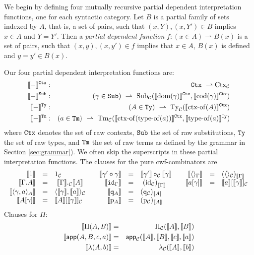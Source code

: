 \documentclass{lmcs}
\newcommand{\intCtxU}[1]{\llbracket #1 \rrbracket^\RawCtx}
\newcommand{\intSubU}[1]{\llbracket #1 \rrbracket^\RawSub}
\newcommand{\intTyU}[1]{\llbracket #1 \rrbracket^\RawTy}
\newcommand{\intTmU}[1]{\llbracket #1 \rrbracket^\RawTm}
\begin{document}
We begin by defining four mutually recursive partial dependent interpretation functions, one for each syntactic category. Let $B$ is a partial family of sets indexed by $A$, that is, a set of pairs, such that $(x,Y), (x,Y') \in B$ implies $x \in A$ and $Y=Y'$. Then a {\em partial dependent function} $f :  (x \in A) \rightharpoonup B(x)$  is a set of pairs, such that $(x,y), (x,y') \in f$ implies that $x \in A$, $B(x)$ is defined and $y = y' \in B(x)$.

Our four partial dependent interpretation functions are:
\begin{eqnarray*}
\intCtxU{-} &:& \RawCtx\ \rightharpoonup \Ctx_\C\\
\intSubU{-}&:& (\gamma \in \RawSub)\ \rightharpoonup \
\Sub_\C(\intCtxU{\domain(\gamma)}, \intCtxU{\codomain(\gamma)})\\
\intTyU{-}&:& (A \in \RawTy)\ \rightharpoonup\ \Ty_\C(\intCtxU{\ctxof(A)})\\
\intTmU{-}&:& (a \in\RawTm)\ \rightharpoonup\
\Tm_\C (\intCtxU{\ctxof(\typeof(a))}, \intTyU{\typeof(a)})
\end{eqnarray*}
where ${\tt Ctx}$ denotes the set of raw contexts, ${\tt Sub}$ the set of raw substitutions, ${\tt Ty}$ the set of raw types, and ${\tt Tm}$ the set of raw terms as defined by the grammar in Section \ref{sec:grammar}). 
We often skip the superscripts in these partial interpretation functions. The clauses for the pure cwf-combinators are
\[
\begin{array}{rclcrclcrcl}
\llbracket 1 \rrbracket &=& 1_{\mathcal C} 						&&
\llbracket \gamma' \circ \gamma \rrbracket &= & \llbracket \gamma' \rrbracket \circ_{\mathcal C} \llbracket \gamma \rrbracket&&
\llbracket  \langle  \rangle_ \Gamma   \rrbracket &=&  (\langle  \rangle_{\mathcal C}) _{ \llbracket \Gamma \rrbracket  }
\\
\llbracket  \Gamma .A \rrbracket &=& \ \llbracket \Gamma \rrbracket ._{\mathcal C} \llbracket A \rrbracket	&&
\llbracket {\tt id}_{\Gamma} \rrbracket & = &\ {(\mathrm{id}_{\mathcal C})}_{\llbracket \Gamma \rrbracket}	&&
\llbracket a[\gamma] \rrbracket &=& \llbracket a \rrbracket[\llbracket \gamma \rrbracket]_{\mathcal C}
\\
\llbracket  \langle  \gamma , a \rangle_A  \rrbracket &=& \langle \llbracket \gamma \rrbracket , \llbracket a \rrbracket \rangle_{\mathcal C}&&
\llbracket {\tt q}_A \rrbracket &= & ({\tt q}_{\mathcal C})_{\llbracket A \rrbracket}
\\
\llbracket A[\gamma] \rrbracket &=& \llbracket A \rrbracket [\llbracket \gamma \rrbracket]_{\mathcal C}		&&
\llbracket \mathrm{p}_A \rrbracket &= & (\mathrm{p}_{\mathcal C})_{\llbracket A \rrbracket} 
\end{array}
\]
Clauses for $\Pi$:
\begin{eqnarray*}
\llbracket \Pi(A,B) \rrbracket &=& \Pi_{\mathcal C}(\llbracket A \rrbracket,\llbracket B \rrbracket)\\
\llbracket \mathsf{app}(A,B,c,a) \rrbracket &=& \mathsf{app}_{\mathcal C}(\llbracket A \rrbracket,\llbracket B \rrbracket,\llbracket c \rrbracket,\llbracket a \rrbracket)\\
\llbracket \lambda(A,b) \rrbracket &=& \lambda_{\mathcal C}(\llbracket A \rrbracket,\llbracket b \rrbracket)
\end{eqnarray*}
\end{document}
